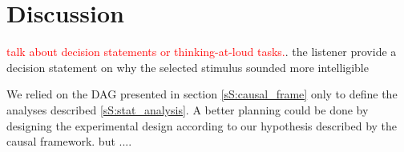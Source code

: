 \section{Discussion} \label{S:discussion}

\textcolor{red}{talk about decision statements or thinking-at-loud tasks.}. the listener provide a decision statement on why the selected stimulus sounded more intelligible

We relied on the DAG presented in section \ref{sS:causal_frame} only to define the analyses described \ref{sS:stat_analysis}. A better planning could be done by designing the experimental design according to our hypothesis described by the causal framework. but ....


\begin{comment}
Previous research already used hierarchical models with the replicated entropy measures as outcomes \citep{Boonen_et_al_2021, Faes_et_al_2021}. Hierarchical models are powerful to control for heterogeneity in the data, and also to avoid pre-aggregating procedures that could be pernicious for a proper statistical inference \citep{McElreath_2020}. 

These claims are easier to understand using a though experiment within our research. Consider we have two children with the same mean entropy, but the second child shows more variability across the $10$ utterances than the first. It is clear that the average entropy measure informs about the child's average SI, indicating that both children have similar level. However, the entropy's heterogeneity across the $10$ utterances also informs about the child's SI, as a higher variability imply transcribers agreed less about the second child's intelligibility.

The intuition derived from the previous though experiment is similar to the one presented in \citet{Boonen_et_al_2021}, and it is what justify our use of a hierarchical model.
\end{comment}